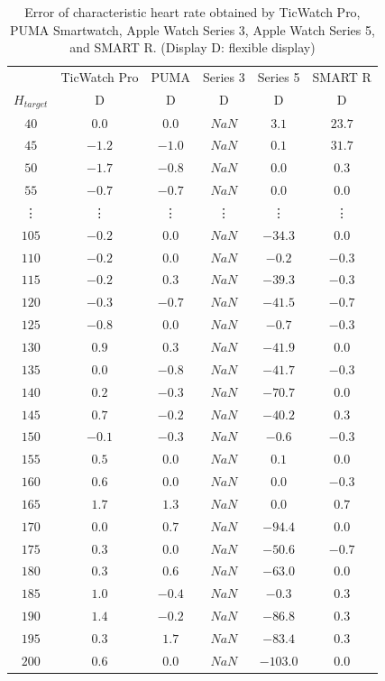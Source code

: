 \documentclass[sigchi,authordraft]{acmart}
\begin{document}
\begin{table}[!t]
  \small
  \centering
  \caption{Error of characteristic heart rate obtained by TicWatch Pro, PUMA Smartwatch, Apple Watch Series 3, Apple Watch Series 5, and SMART R. (Display D: flexible display)}
  \begin{tabular}{c|c|c|c|c|c}
  \toprule
    & TicWatch Pro & PUMA & Series 3 & Series 5 & SMART R \\
    $H_{target}$ & D & D & D & D & D \\
    \midrule
    $40$ & $0.0$ & $0.0$ & $NaN$ & $3.1$ & $23.7$ \\
    $45$ & $-1.2$ & $-1.0$ & $NaN$ & $0.1$ & $31.7$ \\
    $50$ & $-1.7$ & $-0.8$ & $NaN$ & $0.0$ & $0.3$ \\
    $55$ & $-0.7$ & $-0.7$ & $NaN$ & $0.0$ & $0.0$ \\
    \vdots & \vdots & \vdots & \vdots & \vdots & \vdots \\
    $105$ & $-0.2$ & $0.0$ & $NaN$ & $-34.3$ & $0.0$ \\
    $110$ & $-0.2$ & $0.0$ & $NaN$ & $-0.2$ & $-0.3$ \\
    $115$ & $-0.2$ & $0.3$ & $NaN$ & $-39.3$ & $-0.3$ \\
    $120$ & $-0.3$ & $-0.7$ & $NaN$ & $-41.5$ & $-0.7$ \\
    $125$ & $-0.8$ & $0.0$ & $NaN$ & $-0.7$ & $-0.3$ \\
    $130$ & $0.9$ & $0.3$ & $NaN$ & $-41.9$ & $0.0$ \\
    $135$ & $0.0$ & $-0.8$ & $NaN$ & $-41.7$ & $-0.3$ \\
    $140$ & $0.2$ & $-0.3$ & $NaN$ & $-70.7$ & $0.0$ \\
    $145$ & $0.7$ & $-0.2$ & $NaN$ & $-40.2$ & $0.3$ \\
    $150$ & $-0.1$ & $-0.3$ & $NaN$ & $-0.6$ & $-0.3$ \\
    $155$ & $0.5$ & $0.0$ & $NaN$ & $0.1$ & $0.0$ \\
    $160$ & $0.6$ & $0.0$ & $NaN$ & $0.0$ & $-0.3$ \\
    $165$ & $1.7$ & $1.3$ & $NaN$ & $0.0$ & $0.7$ \\
    $170$ & $0.0$ & $0.7$ & $NaN$ & $-94.4$ & $0.0$ \\
    $175$ & $0.3$ & $0.0$ & $NaN$ & $-50.6$ & $-0.7$ \\
    $180$ & $0.3$ & $0.6$ & $NaN$ & $-63.0$ & $0.0$ \\
    $185$ & $1.0$ & $-0.4$ & $NaN$ & $-0.3$ & $0.3$ \\
    $190$ & $1.4$ & $-0.2$ & $NaN$ & $-86.8$ & $0.3$ \\
    $195$ & $0.3$ & $1.7$ & $NaN$ & $-83.4$ & $0.3$ \\
    $200$ & $0.6$ & $0.0$ & $NaN$ & $-103.0$ & $0.0$ \\
    \bottomrule
  \end{tabular}
  \label{tab:result_expansion}
\end{table}
\end{document}
